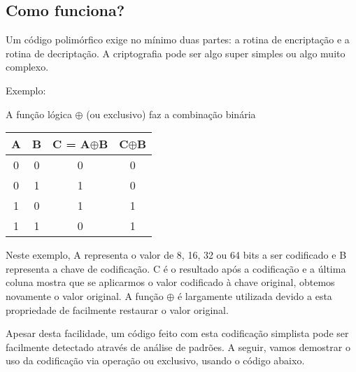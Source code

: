 \subsection{Como funciona?}

Um código polimórfico exige no mínimo duas partes: a rotina de encriptação e a rotina de decriptação. A criptografia pode ser algo super simples ou algo muito complexo.

Exemplo: 

A função lógica $ \oplus $ (ou exclusivo) faz a combinação binária

\begin{tabular}{|c|c|c|c|}
\hline 
A&B&C = A$ \oplus $B&C$ \oplus $B\\
\hline
0&0&0&0\\
0&1&1&0\\
1&0&1&1\\
1&1&0&1\\
\hline
\end{tabular}

Neste exemplo, A representa o valor de 8, 16, 32 ou 64 bits a ser codificado e B representa a chave de codificação. C é o resultado após a codificação e a última coluna mostra que se aplicarmos o valor codificado à chave original, obtemos novamente o valor original. A função $ \oplus $ é largamente utilizada devido a esta propriedade de facilmente restaurar o valor original.

Apesar desta facilidade, um código feito com esta codificação simplista pode ser facilmente detectado através de análise de padrões. A seguir, vamos demostrar o uso da codificação via operação ou exclusivo, usando o código abaixo.


